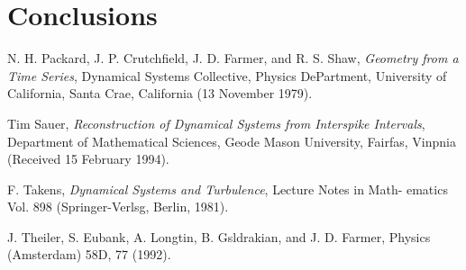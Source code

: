 \documentclass[10pt]{article}
\begin{document}
\section{Conclusions}

\begin{thebibliography}{99}
 
N. H. Packard, J. P. Crutchfield, J. D. Farmer, and R. S. Shaw, {\it Geometry from a Time Series}, Dynamical Systems Collective, Physics DePartment, University of California, Santa Crae, California (13 November 1979).

Tim Sauer, {\it Reconstruction of Dynamical Systems from Interspike Intervals}, Department of Mathematical Sciences, Geode Mason University, Fairfas, Vinpnia (Received 15 February 1994).

F. Takens, {\it Dynamical Systems and Turbulence}, Lecture Notes in Math-
ematics Vol. 898 (Springer-Verlsg, Berlin, 1981).

J. Theiler, S. Eubank, A. Longtin, B. Gsldrakian, and
J. D. Farmer, Physics (Amsterdam) 58D, 77 (1992).

\end{thebibliography}
\end{document}
